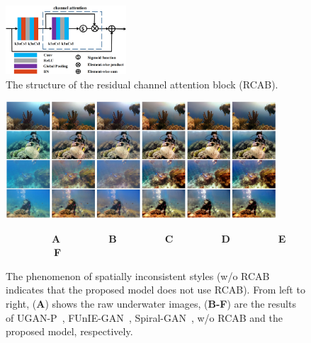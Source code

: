 \documentclass[utf8]{FrontiersinHarvard} %
\begin{document}
\begin{figure}[htbp]
\begin{center}
\includegraphics[width=0.4\textwidth]{FSpiralGAN_frontiers/onepicture/RCAB300.jpg}
\end{center}
 \caption{The structure of the residual channel attention block (RCAB).\label{fig:RCABarchitecture}}
\end{figure}

\begin{figure}[htbp]
\begin{center}
\includegraphics[width=0.9\textwidth]{FSpiralGAN_frontiers/onepicture/spatial_inconsistent300.jpg}
\end{center}
$~~~~~~~~~~~~~~~~~~~~~$\textbf{A}$~~~~~~~~~~~~~~~~~~~~~~$\textbf{B}$~~~~~~~~~~~~~~~~~~~~~~$\textbf{C}$~~~~~~~~~~~~~~~~~~~~~~$\textbf{D}$~~~~~~~~~~~~~~~~~~~~~~$\textbf{E}$~~~~~~~~~~~~~~~~~~~~~~$\textbf{F}
 \caption{The phenomenon of spatially inconsistent styles (w/o RCAB indicates that the proposed model does not use RCAB). From left to right, (\textbf{A}) shows the raw underwater images, (\textbf{B-F}) are the results of UGAN-P~\citep{8460552}, FUnIE-GAN~\citep{9001231}, Spiral-GAN~\citep{2020Underwater}, w/o RCAB and the proposed model, respectively.\label{fig:comparison-spatial_inconsistent1}}
\end{figure}
\end{document}
